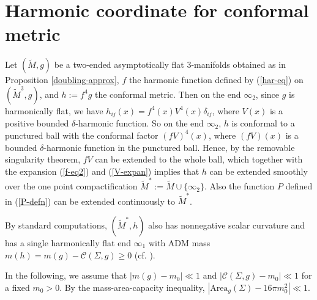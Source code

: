 \documentclass[letter]{amsart}
\theoremstyle{definition}
\theoremstyle{remark}
\begin{document}
\section{Harmonic coordinate for conformal metric}
Let $(\tilde{M}, g)$ be a two-ended asymptotically flat $3$-manifolds obtained as in Proposition \ref{doubling-approx},  $f$ the harmonic function defined by (\ref{har-eq}) on $(\tilde{M}^{3}, g)$, and $h:= f^{4}g$ the conformal metric. Then on the end $\infty_2$, since $g$ is harmonically flat, we have $h_{ij}(x) = f^{4}(x) V^{4}(x) \delta_{ij} $, where $V(x)$ is a positive bounded $\delta $-harmonic function. So on the end $\infty_2$, $h$ is conformal to a punctured ball with the conformal factor $(fV)^{4}(x)$, where $(fV)(x)$ is a bounded $\delta $-harmonic function in the punctured ball. Hence, by the removable singularity theorem, $fV$ can be extended to the whole ball, which together with the expansion (\ref{f-eq2}) and (\ref{V-expan}) implies that $h$ can be extended smoothly over the one point compactification $\tilde{M}^*:=\tilde{M}\cup \{\infty_2\}$. Also the function $P$ defined in (\ref{P-defn}) can be extended continuously to $\tilde{M}^*$. 

By standard computations, $(\tilde{M}^*, h)$ also has nonnegative scalar curvature and has a single harmonically flat end $\infty_1$ with ADM mass $m(h)= m(g) -  \mathcal{C}(\Sigma, g) \geq 0$ (cf. \cite[Equation (84)]{Bray'01}).

In the following, we assume that $|m(g) - m_0 | \ll 1$ and $|\mathcal{C}(\Sigma ,g) - m_0| \ll 1$ for a fixed $m_0>0$. By the mass-area-capacity inequality, $|\mathrm{Area}_g(\Sigma ) - 16 \pi m_0^2| \ll 1$.

\end{document}
